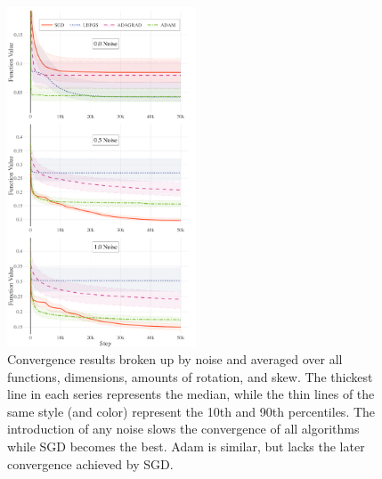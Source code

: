 \documentclass[conference]{ieeeconf}  %
\begin{document}
\begin{figure}
  \centering
  \includegraphics[width=0.5\textwidth]{Figures/final-noise}
  \caption{Convergence results broken up by noise and averaged over
    all functions, dimensions, amounts of rotation, and skew. The
    thickest line in each series represents the median, while the thin
    lines of the same style (and color) represent the 10th and 90th
    percentiles. The introduction of any noise slows the convergence
    of all algorithms while SGD becomes the best. Adam is similar, but
    lacks the later convergence achieved by SGD.}
  \label{fig:results-noise}
\end{figure}
\end{document}
